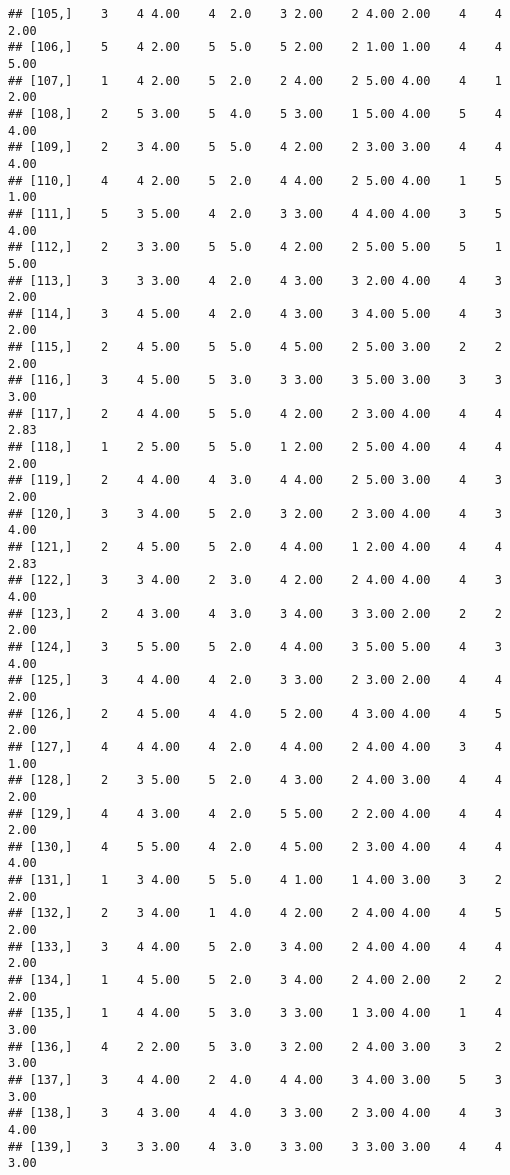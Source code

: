 \documentclass[]{article}
\begin{document}
\begin{verbatim}
## [105,]    3    4 4.00    4  2.0    3 2.00    2 4.00 2.00    4    4 2.00
## [106,]    5    4 2.00    5  5.0    5 2.00    2 1.00 1.00    4    4 5.00
## [107,]    1    4 2.00    5  2.0    2 4.00    2 5.00 4.00    4    1 2.00
## [108,]    2    5 3.00    5  4.0    5 3.00    1 5.00 4.00    5    4 4.00
## [109,]    2    3 4.00    5  5.0    4 2.00    2 3.00 3.00    4    4 4.00
## [110,]    4    4 2.00    5  2.0    4 4.00    2 5.00 4.00    1    5 1.00
## [111,]    5    3 5.00    4  2.0    3 3.00    4 4.00 4.00    3    5 4.00
## [112,]    2    3 3.00    5  5.0    4 2.00    2 5.00 5.00    5    1 5.00
## [113,]    3    3 3.00    4  2.0    4 3.00    3 2.00 4.00    4    3 2.00
## [114,]    3    4 5.00    4  2.0    4 3.00    3 4.00 5.00    4    3 2.00
## [115,]    2    4 5.00    5  5.0    4 5.00    2 5.00 3.00    2    2 2.00
## [116,]    3    4 5.00    5  3.0    3 3.00    3 5.00 3.00    3    3 3.00
## [117,]    2    4 4.00    5  5.0    4 2.00    2 3.00 4.00    4    4 2.83
## [118,]    1    2 5.00    5  5.0    1 2.00    2 5.00 4.00    4    4 2.00
## [119,]    2    4 4.00    4  3.0    4 4.00    2 5.00 3.00    4    3 2.00
## [120,]    3    3 4.00    5  2.0    3 2.00    2 3.00 4.00    4    3 4.00
## [121,]    2    4 5.00    5  2.0    4 4.00    1 2.00 4.00    4    4 2.83
## [122,]    3    3 4.00    2  3.0    4 2.00    2 4.00 4.00    4    3 4.00
## [123,]    2    4 3.00    4  3.0    3 4.00    3 3.00 2.00    2    2 2.00
## [124,]    3    5 5.00    5  2.0    4 4.00    3 5.00 5.00    4    3 4.00
## [125,]    3    4 4.00    4  2.0    3 3.00    2 3.00 2.00    4    4 2.00
## [126,]    2    4 5.00    4  4.0    5 2.00    4 3.00 4.00    4    5 2.00
## [127,]    4    4 4.00    4  2.0    4 4.00    2 4.00 4.00    3    4 1.00
## [128,]    2    3 5.00    5  2.0    4 3.00    2 4.00 3.00    4    4 2.00
## [129,]    4    4 3.00    4  2.0    5 5.00    2 2.00 4.00    4    4 2.00
## [130,]    4    5 5.00    4  2.0    4 5.00    2 3.00 4.00    4    4 4.00
## [131,]    1    3 4.00    5  5.0    4 1.00    1 4.00 3.00    3    2 2.00
## [132,]    2    3 4.00    1  4.0    4 2.00    2 4.00 4.00    4    5 2.00
## [133,]    3    4 4.00    5  2.0    3 4.00    2 4.00 4.00    4    4 2.00
## [134,]    1    4 5.00    5  2.0    3 4.00    2 4.00 2.00    2    2 2.00
## [135,]    1    4 4.00    5  3.0    3 3.00    1 3.00 4.00    1    4 3.00
## [136,]    4    2 2.00    5  3.0    3 2.00    2 4.00 3.00    3    2 3.00
## [137,]    3    4 4.00    2  4.0    4 4.00    3 4.00 3.00    5    3 3.00
## [138,]    3    4 3.00    4  4.0    3 3.00    2 3.00 4.00    4    3 4.00
## [139,]    3    3 3.00    4  3.0    3 3.00    3 3.00 3.00    4    4 3.00

\end{verbatim}
\end{document}
